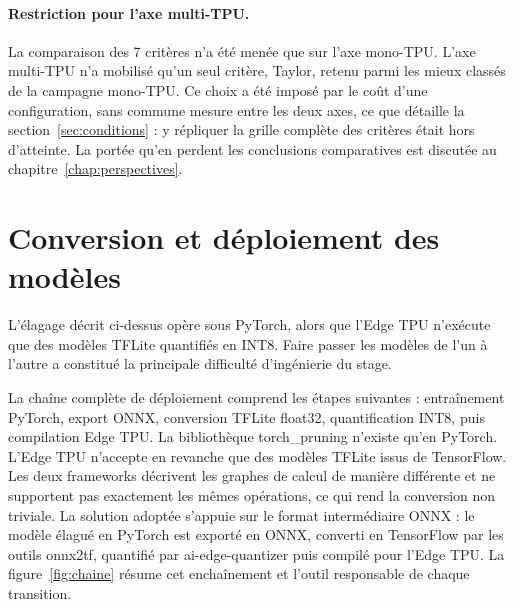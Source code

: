 \documentclass[11pt,a4paper]{report}
\begin{document}
\paragraph{Restriction pour l'axe multi-TPU.} La comparaison des 7 critères n'a été menée que sur l'axe mono-TPU. L'axe multi-TPU n'a mobilisé qu'un seul critère, Taylor, retenu parmi les mieux classés de la campagne mono-TPU. Ce choix a été imposé par le coût d'une configuration, sans commune mesure entre les deux axes, ce que détaille la section~\ref{sec:conditions} : y répliquer la grille complète des critères était hors d'atteinte. La portée qu'en perdent les conclusions comparatives est discutée au chapitre~\ref{chap:perspectives}.

\section{Conversion et déploiement des modèles}
\label{sec:conversion}

L'élagage décrit ci-dessus opère sous PyTorch, alors que l'Edge TPU n'exécute que des modèles TFLite quantifiés en INT8. Faire passer les modèles de l'un à l'autre a constitué la principale difficulté d'ingénierie du stage.

La chaîne complète de déploiement comprend les étapes suivantes : entraînement PyTorch, export ONNX, conversion TFLite float32, quantification INT8, puis compilation Edge TPU. La bibliothèque torch\_pruning n'existe qu'en PyTorch. L'Edge TPU n'accepte en revanche que des modèles TFLite issus de TensorFlow. Les deux frameworks décrivent les graphes de calcul de manière différente et ne supportent pas exactement les mêmes opérations, ce qui rend la conversion non triviale. La solution adoptée s'appuie sur le format intermédiaire ONNX : le modèle élagué en PyTorch est exporté en ONNX, converti en TensorFlow par les outils onnx2tf, quantifié par ai-edge-quantizer puis compilé pour l'Edge TPU. La figure~\ref{fig:chaine} résume cet enchaînement et l'outil responsable de chaque transition.
\end{document}
